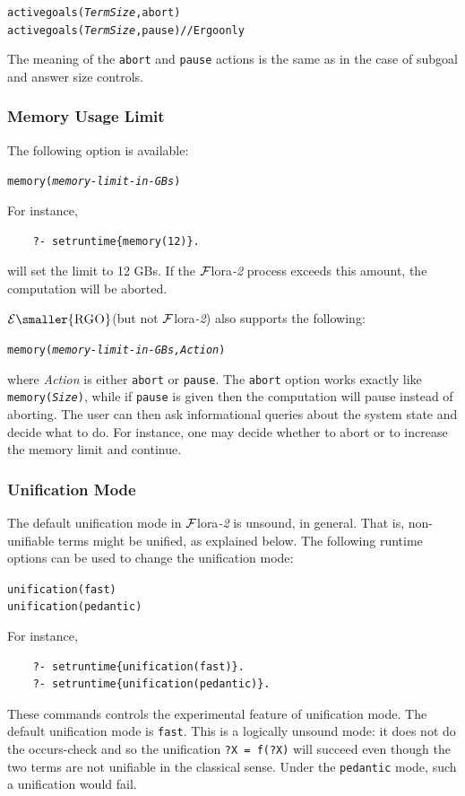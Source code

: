 \documentclass[11pt]{article}
\newcommand{\FLORA}{{\mbox{\sc ${\cal F}${lora}\rm\emph{-2}}}\xspace}
\newcommand{\ERGO}{\ensuremath{\cal{E}\mbox{\smaller{\sc{RGO}}}}\xspace}
\newcommand{\FLSYSTEM}{\FLORA}
\begin{document}
\begin{alltt}
    activegoals(\emph{TermSize},abort)
    activegoals(\emph{TermSize},pause)        \textnormal{// Ergo only}
\end{alltt}
The meaning of the \texttt{abort}   and \texttt{pause}  actions
is the same as in the case of subgoal and answer size controls.

\subsubsection{Memory Usage Limit}

The following option is available:
\begin{alltt}
    memory(\textit{memory-limit-in-GBs})
\end{alltt}
For instance,
\begin{verbatim}
    ?- setruntime{memory(12)}.
\end{verbatim}
will set the limit to 12 GBs. If the \FLSYSTEM process exceeds this amount,
the computation will be aborted.

\noindent
\ERGO (but not \FLORA) also supports the following:
\begin{alltt}
    memory(\textit{memory-limit-in-GBs,Action})
\end{alltt}
where \emph{Action} is either \texttt{abort} or \texttt{pause}. The
\texttt{abort} option works exactly like
\texttt{memory(\textit{Size})}, while if \texttt{pause} is given then
the computation will pause instead of aborting. The user can then ask
informational queries about the system state and decide what to do.
For instance, one may decide whether to abort or to increase the memory
limit and continue.

\subsubsection{Unification Mode}

The default unification mode in \FLSYSTEM is
unsound, in general. That is, non-unifiable terms might be unified, as
explained below. The following runtime options can be used to change the
unification mode:
\begin{alltt}
    unification(fast)
    unification(pedantic)
\end{alltt}
For instance,
\begin{verbatim}
    ?- setruntime{unification(fast)}.
    ?- setruntime{unification(pedantic)}.
\end{verbatim}
These commands controls the experimental feature of unification mode.
The default unification mode is \texttt{fast}. This is a logically unsound
mode: it does not do the occurs-check and so the unification
\texttt{?X = f(?X)} will succeed even though the two terms are not
unifiable in the classical sense. Under the \texttt{pedantic} mode, such a
unification would fail.
\end{document}
